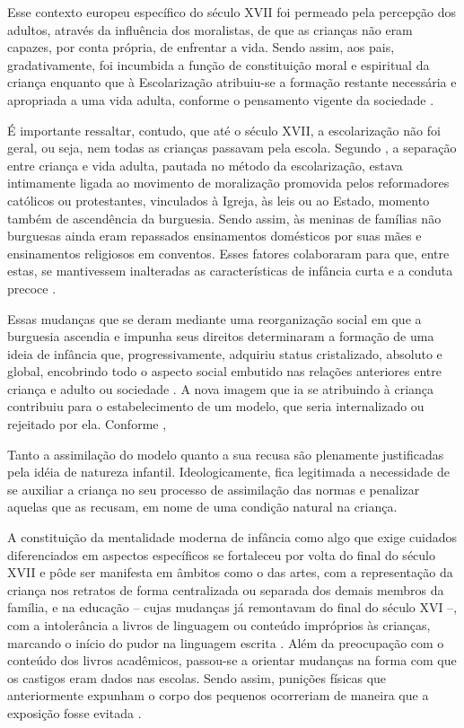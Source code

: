 Esse contexto europeu específico do século XVII foi permeado pela percepção dos adultos, através da influência dos moralistas, de que as crianças não eram capazes, por conta própria, de enfrentar a vida. Sendo assim, aos pais, gradativamente, foi incumbida a função de constituição moral e espiritual da criança enquanto que à Escolarização atribuiu-se a formação restante necessária e apropriada a uma vida adulta, conforme o pensamento vigente da sociedade \cite{MIRANDA1989}.  

É importante ressaltar, contudo, que até o século XVII, a escolarização não foi geral, ou seja, nem todas as crianças passavam pela escola. Segundo , a separação entre criança e vida adulta, pautada no método da escolarização, estava intimamente ligada ao movimento de moralização promovida pelos reformadores católicos ou protestantes, vinculados à Igreja, às leis ou ao Estado, momento também de ascendência da burguesia. Sendo assim, às meninas de famílias não burguesas ainda eram repassados ensinamentos domésticos por suas mães e ensinamentos religiosos em conventos. Esses fatores colaboraram para que, entre estas, se mantivessem inalteradas as características de infância curta e a conduta precoce \cite{ARIES2011}. 

Essas mudanças que se deram mediante uma reorganização social em que a burguesia ascendia e impunha seus direitos determinaram a formação de uma ideia de infância que, progressivamente, adquiriu status cristalizado, absoluto e global, encobrindo todo o aspecto social embutido nas relações anteriores entre criança e adulto ou sociedade \cite{MIRANDA1989}. A nova imagem que ia se atribuindo à criança contribuiu para o estabelecimento de um modelo, que seria internalizado ou rejeitado por ela. Conforme , 

\begin{citacao}
	Tanto a assimilação do modelo quanto a sua recusa são plenamente justificadas pela idéia de natureza infantil. Ideologicamente, fica legitimada a necessidade de se auxiliar a criança no seu processo de assimilação das normas e penalizar aquelas que as recusam, em nome de uma condição natural na criança.
\end{citacao}

A constituição da mentalidade moderna de infância como algo que exige cuidados diferenciados em aspectos específicos se fortaleceu por volta do final do século XVII e pôde ser manifesta em âmbitos como o das artes\footnotemark, com a representação da criança nos retratos de forma centralizada ou separada dos demais membros da família, e na educação -- cujas mudanças já remontavam do final do século XVI --, com a intolerância a livros de linguagem ou conteúdo impróprios às crianças, marcando o início do pudor na linguagem escrita \cite{ARIES2011}. Além da preocupação com o conteúdo dos livros acadêmicos, passou-se a orientar mudanças na forma com que os castigos eram dados nas escolas. Sendo assim, punições físicas que anteriormente expunham o corpo dos pequenos ocorreriam de maneira que a exposição fosse evitada \cite{ARIES1981}.

